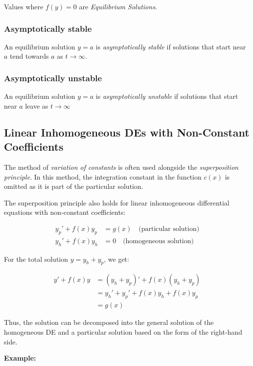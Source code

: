 Values where \(f(y) = 0\) are \emph{Equilibrium Solutions}.

\subsubsection*{Asymptotically stable}

An equilibrium solution \(y = a\) is \emph{asymptotically stable} if solutions
that start near \(a\) tend towards \(a\) as \(t \to \infty\).

\subsubsection*{Asymptotically unstable}

An equilibrium solution \(y = a\) is \emph{asymptotically unstable} if solutions
that start near \(a\) leave as \(t \to \infty\)

\subsection{Linear Inhomogeneous DEs with Non-Constant Coefficients}

The method of \emph{variation of constants} is often used alongside the \emph{superposition principle}. 
In this method, the integration constant in the function \( c(x) \) is omitted as it is part of the 
particular solution.

The superposition principle also holds for linear inhomogeneous differential equations with 
non-constant coefficients:

\begin{align*}
    y_p' + f(x)y_p &= g(x) \quad \text{(particular solution)} \\
    y_h' + f(x)y_h &= 0 \quad \text{(homogeneous solution)}
\end{align*}

For the total solution \( y = y_h + y_p \), we get:

\begin{align*}
    y' + f(x)y 
    &= (y_h + y_p)' + f(x)(y_h + y_p) \\
    &= y_h' + y_p' + f(x)y_h + f(x)y_p \\
    &= g(x)
\end{align*}

Thus, the solution can be decomposed into the general solution of the homogeneous DE and a 
particular solution based on the form of the right-hand side.

\textbf{Example: }

